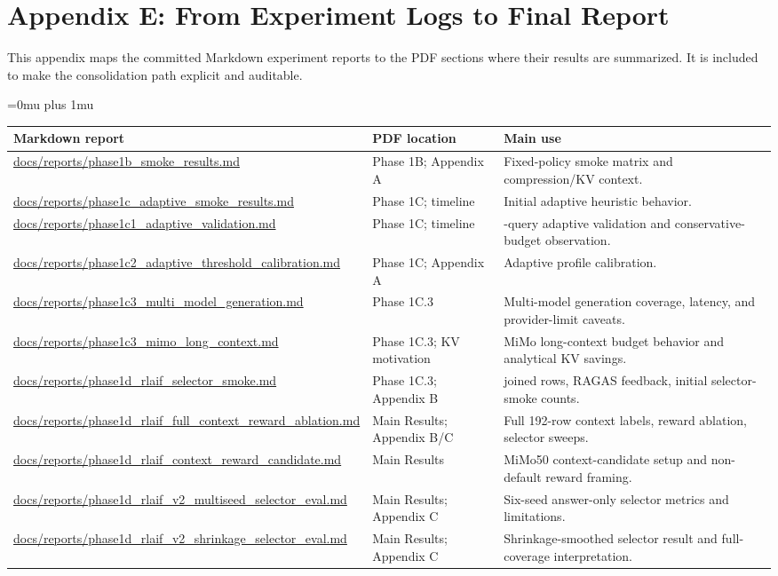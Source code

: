 \section{Appendix E: From Experiment Logs to Final Report}

This appendix maps the committed Markdown experiment reports to the PDF sections where their results are summarized. It is included to make the consolidation path explicit and auditable.

{\scriptsize
\Urlmuskip=0mu plus 1mu
\begin{longtable}{>{\raggedright\arraybackslash}p{6.2cm} >{\raggedright\arraybackslash}p{4.5cm} >{\raggedright\arraybackslash}p{3.5cm}}
\toprule
Markdown report & PDF location & Main use \\
\midrule
\url{docs/reports/phase1b_smoke_results.md} & Phase 1B; Appendix A & Fixed-policy smoke matrix and compression/KV context. \\
\url{docs/reports/phase1c_adaptive_smoke_results.md} & Phase 1C; timeline & Initial adaptive heuristic behavior. \\
\url{docs/reports/phase1c1_adaptive_validation.md} & Phase 1C; timeline & 50-query adaptive validation and conservative-budget observation. \\
\url{docs/reports/phase1c2_adaptive_threshold_calibration.md} & Phase 1C; Appendix A & Adaptive profile calibration. \\
\url{docs/reports/phase1c3_multi_model_generation.md} & Phase 1C.3 & Multi-model generation coverage, latency, and provider-limit caveats. \\
\url{docs/reports/phase1c3_mimo_long_context.md} & Phase 1C.3; KV motivation & MiMo long-context budget behavior and analytical KV savings. \\
\url{docs/reports/phase1d_rlaif_selector_smoke.md} & Phase 1C.3; Appendix B & 192 joined rows, RAGAS feedback, initial selector-smoke counts. \\
\url{docs/reports/phase1d_rlaif_full_context_reward_ablation.md} & Main Results; Appendix B/C & Full 192-row context labels, reward ablation, selector sweeps. \\
\url{docs/reports/phase1d_rlaif_context_reward_candidate.md} & Main Results & MiMo50 context-candidate setup and non-default reward framing. \\
\url{docs/reports/phase1d_rlaif_v2_multiseed_selector_eval.md} & Main Results; Appendix C & Six-seed answer-only selector metrics and limitations. \\
\url{docs/reports/phase1d_rlaif_v2_shrinkage_selector_eval.md} & Main Results; Appendix C & Shrinkage-smoothed selector result and full-coverage interpretation. \\

\end{longtable}}
